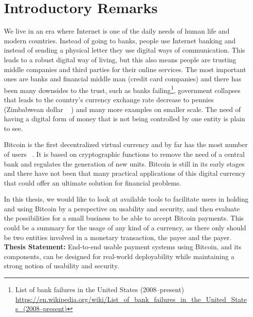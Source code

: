 
\chapter{Introductory Remarks}

\setcounter{page}{1}

We live in an era where Internet is one of the daily needs of human life and modern countries. Instead of going to banks, people use Internet banking and instead of sending a physical letter they use digital ways of communication. This leads to a robust digital way of living, but this also means people are trusting middle companies and third parties for their online services. The most important ones are banks and financial middle man (\eg credit card companies) and there has been many downsides to the trust, such as banks failing\footnote{List of bank failures in the United States (2008–present) \url{https://en.wikipedia.org/wiki/List_of_bank_failures_in_the_United_States_(2008–present)}}, government collapses that leads to the country's currency exchange rate decrease to pennies (\eg Zimbabwean dollar ~\cite{hanke2009measurement} ) and many more examples on smaller scale. The need of having a digital form of money that is not being controlled by one entity is plain to see.

Bitcoin is the first decentralized virtual currency and by far has the most number of users ~\cite{Nak08}. It is based on cryptographic functions to remove the need of a central bank and regulates the generation of new units. Bitcoin is still in its early stages and there have not been that many practical applications of this digital currency that could offer an ultimate solution for financial problems.

In this thesis, we would like to look at available tools to facilitate users in holding and using Bitcoin by a perspective on usability and security, and then evaluate the possibilities for a small business to be able to accept Bitcoin payments. This could be a summary for the usage of any kind of a currency, as there only should be two entities involved in a monetary transaction, the payee and the payer.\\

\textbf{Thesis Statement:} End-to-end usable payment systems using Bitcoin, and its components, can be designed for real-world deployability while maintaining a strong notion of usability and security.

